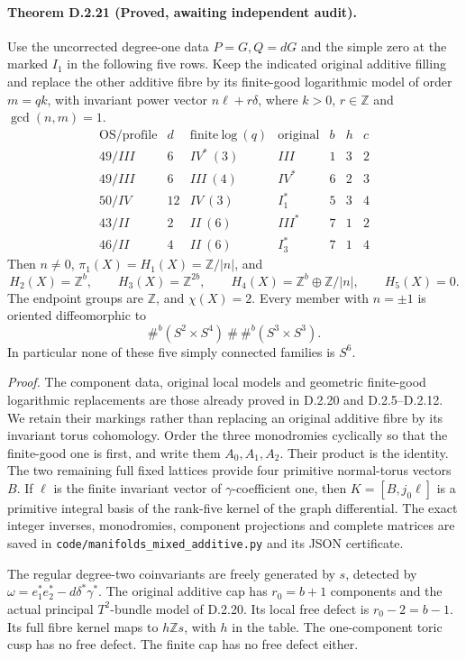 \paragraph{Theorem D.2.21 (Proved, awaiting independent audit).}
Use the uncorrected degree-one data $P=G,Q=dG$ and the simple zero at the
marked $I_1$ in the following five rows. Keep the indicated original
additive filling and replace the other additive fibre by its finite-good
logarithmic model of order $m=qk$, with invariant power vector
$n\ell+r\delta$, where $k>0$, $r\in\mathbb Z$ and $\gcd(n,m)=1$.
\[
\begin{array}{c|c|c|r|r|r|r}
\mathrm{OS/profile}&d&\mathrm{finite\ log}\ (q)&\mathrm{original}&b&h&c\\\hline
49/III&6&IV^*\ (3)&III&1&3&2\\
49/III&6&III\ (4)&IV^*&6&2&3\\
50/IV&12&IV\ (3)&I_1^*&5&3&4\\
43/II&2&II\ (6)&III^*&7&1&2\\
46/II&4&II\ (6)&I_3^*&7&1&4
\end{array}
\]
Then $n\ne0$, $\pi_1(X)=H_1(X)=\mathbb Z/|n|$, and
\[
 H_2(X)=\mathbb Z^b,\qquad H_3(X)=\mathbb Z^{2b},\qquad
 H_4(X)=\mathbb Z^b\oplus\mathbb Z/|n|,\qquad H_5(X)=0.
\]
The endpoint groups are $\mathbb Z$, and $\chi(X)=2$.
Every member with $n=\pm1$ is oriented diffeomorphic to
\[
                 \#^b(S^2\times S^4)\ \#\ \#^b(S^3\times S^3).
\]
In particular none of these five simply connected families is $S^6$.

\emph{Proof.} The component data, original local models and geometric
finite-good logarithmic replacements are those already proved in
D.2.20 and D.2.5--D.2.12. We retain their markings rather than replacing
an original additive fibre by its invariant torus cohomology. Order the
three monodromies cyclically so that the finite-good one is first, and
write them $A_0,A_1,A_2$. Their product is the identity. The two remaining
full fixed lattices provide four primitive normal-torus vectors $B$.
If $\ell$ is the finite invariant vector of $\gamma$-coefficient one,
then $K=[B,j_0\ell]$ is a primitive integral basis of the rank-five
kernel of the graph differential. The exact integer inverses, monodromies,
component projections and complete matrices are saved in
\texttt{code/manifolds\_mixed\_additive.py} and its JSON certificate.

The regular degree-two coinvariants are freely generated by $s$, detected
by $\omega=e_1^*e_2^*-d\delta^*\gamma^*$. The original additive cap has
$r_0=b+1$ components and the actual principal $T^2$-bundle model of
D.2.20. Its local free defect is $r_0-2=b-1$. Its full fibre kernel maps
to $h\mathbb Zs$, with $h$ in the table. The one-component toric cusp
has no free defect. The finite cap has no free defect either.

